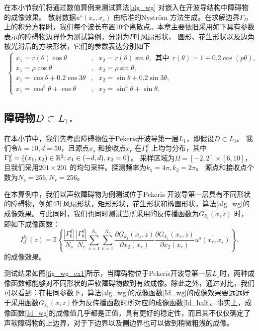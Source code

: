 在本小节我们将通过数值算例来测试算法\ref{alg_wg} 对嵌入在开波导结构中障碍物的成像效果。 散射数据$u^s(x_r,x_s)$ 由标准的Nystr\"om 方法生成。在求解边界$\Gamma_D$上的积分方程时，我们每个波长布置10个离散点。本章主要依旧采用如下具有参数表示的障碍物边界作为测试算例，分别为$P$叶风扇形状、 圆形、花生形状以及边角被光滑后的方块形状，它们的参数表达分别如下
\begin{eqnarray}\label{obstacle_example2}
\left\{
\begin{array}{lll}
x_1=r(\theta)\cos\theta&,& x_2=r(\theta)\sin\theta,\ \ \mbox{其中}\ \ r(\theta)=1+0.2\cos(p\theta),\\
x_1=\rho\cos{\theta}&,& x_2=\rho\sin{\theta},\\
x_1=\cos{\theta}+0.2\cos{3\theta}&,& x_2=\sin{\theta}+0.2\sin{3\theta},\\
x_1=\cos^3\theta+\cos{\theta}&,& x_2=\sin^3\theta+\sin{\theta}.
\end{array}
\right.
\end{eqnarray}
\subsection{障碍物$D\subset L_1$.}
在本小节中，我们先考虑障碍物位于Pekeris开波导第一层$L_1$，即假设$D\subset L_1$。 我们令$h=10,d=50$，且源点$x_s$ 和接收点$x_r$ 在$\Gamma_0^d$ 上均匀分布，其中$\Gamma_0^d=\{(x_1,x_2)\in\mathbb{R}^2;x_1\in(-d,d),x_2=0\}$。 采样区域为$\Omega=[-2,2]\times[6,10]$，且我们采用$201\times201$ 的均匀采样。探测频率为$k_1=4\pi,k_2=2\pi$。 源点和接收点个数为$N_s=256,N_r=256$。
\begin{example}[不同形状]\label{wg_ex1}
在本算例中，我们以声软障碍物为例测试位于Pekeris 开波导第一层具有不同形状的障碍物，例如4叶风扇形状，矩形形状，花生形状和椭圆形状，算法\ref{alg_wg}的成像效果。与此同时，我们也同时测试当所采用的反传播函数为$G_{k_1}(x,z)$ 时，即如下成像函数：
\begin{equation}\label{Id_half}
   I_d^{k_1}(z)=\Im\left\{\frac{|\Gamma_0^d|}{N_s}\frac{|\Gamma_0^d|}{N_r}\sum\limits_{s=1}^{N_s}\sum\limits_{r=1}^{N_r}\frac{\partial G_{k_1}(x_s,z)}{\partial x_2(x_s)}\frac{\partial G_{k_1}(x_r,z)}{\partial x_2(x_r)}\overline{u^s(x_r,x_s)}
  \right\}.
\end{equation}
的成像效果。

测试结果如图\ref{fig_wg_ex1}所示，当障碍物位于Pekeris开波导第一层$L_1$时，两种成像函数都能够对不同形状的声软障碍物做到有效成像。除此之外，通过对比，我们可以看到：在相同参数下，算法\ref{alg_wg}的成像函数\eqref{Id_wg}的成像效果要远远好于采用函数$G_{k_1}(x,z)$作为反传播函数时所对应的成像函数\eqref{Id_half}。事实上，成像函数\ref{Id_wg}的成像值几乎都是正值，具有更好的稳定性，而且其不仅仅确定了声软障碍物的上边界，对于下边界以及侧边界也可以做到稍微粗浅的成像。
\end{example}

